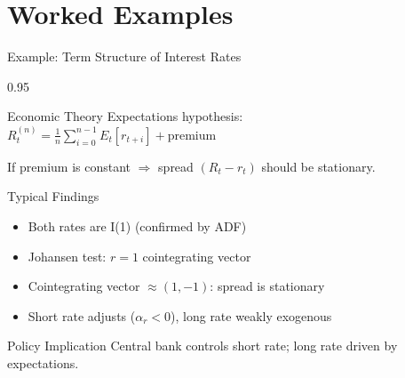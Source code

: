 \documentclass[9pt, aspectratio=169, t]{beamer}
\begin{document}
\section{Worked Examples}

\begin{frame}{Example: Term Structure of Interest Rates}
    \begin{cminipage}{0.95\textwidth}
    {\small
    \begin{block}{Economic Theory}
        Expectations hypothesis: $R_t^{(n)} = \frac{1}{n}\sum_{i=0}^{n-1} E_t[r_{t+i}] + \text{premium}$

        If premium is constant $\Rightarrow$ spread $(R_t - r_t)$ should be stationary.
    \end{block}
    \begin{exampleblock}{Typical Findings}
        \begin{itemize}\setlength{\itemsep}{0pt}
            \item Both rates are I(1) (confirmed by ADF)
            \item Johansen test: $r = 1$ cointegrating vector
            \item Cointegrating vector $\approx (1, -1)$: spread is stationary
            \item Short rate adjusts ($\alpha_r < 0$), long rate weakly exogenous
        \end{itemize}
    \end{exampleblock}
    \begin{block}{Policy Implication}
        Central bank controls short rate; long rate driven by expectations.
    \end{block}
    }
    \end{cminipage}
\end{frame}
\end{document}
